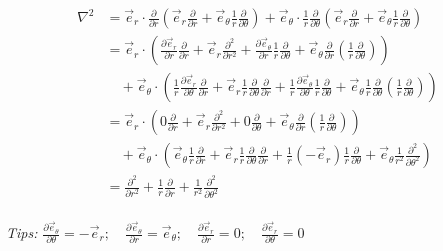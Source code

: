 \begin{frame}
	\[ \begin{aligned}
	\nabla ^2 &= \vec{e}_r \cdot\frac{\partial }{\partial r}  (\vec{e}_r \frac{\partial }{\partial r} +   \vec{e}_\theta \frac{1}{r} \frac{\partial }{\partial \theta})+  \vec{e}_\theta \cdot \frac{1}{r} \frac{\partial }{\partial \theta} (\vec{e}_r \frac{\partial }{\partial r} +   \vec{e}_\theta \frac{1}{r} \frac{\partial }{\partial \theta})\\
	&=\vec{e}_r \cdot (\frac{\partial \vec{e}_r}{\partial r} \frac{\partial }{\partial r} + \vec{e}_r \frac{\partial ^2 }{\partial r ^2}+  \frac{\partial \vec{e}_\theta}{\partial r} \frac{1}{r}\frac{\partial }{\partial \theta}+  \vec{e}_\theta\frac{\partial }{\partial r} (\frac{1}{r}\frac{\partial }{\partial \theta})) \\
	&\hspace{1em} + \vec{e}_\theta \cdot (\frac{1}{r}\frac{\partial \vec{e}_r}{\partial \theta} \frac{\partial }{\partial r} + \vec{e}_r \frac{1}{r} \frac{\partial }{\partial \theta} \frac{\partial }{\partial r} + \frac{1}{r} \frac{\partial  \vec{e}_\theta}{\partial \theta} \frac{1}{r} \frac{\partial }{\partial \theta} + \vec{e}_\theta \frac{1}{r} \frac{\partial }{\partial \theta} (\frac{1}{r} \frac{\partial }{\partial \theta} )
	) \\
	&=\vec{e}_r \cdot (0 \frac{\partial }{\partial r} + \vec{e}_r \frac{\partial ^2 }{\partial r ^2}+  0\frac{\partial }{\partial \theta}+  \vec{e}_\theta\frac{\partial }{\partial r} (\frac{1}{r}\frac{\partial }{\partial \theta})) \\
	&\hspace{1em} + \vec{e}_\theta \cdot (\vec{e}_\theta \frac{1}{r}\frac{\partial }{\partial r} + \vec{e}_r \frac{1}{r} \frac{\partial }{\partial \theta} \frac{\partial }{\partial r} + \frac{1}{r} (-\vec{e}_r) \frac{1}{r} \frac{\partial }{\partial \theta} + \vec{e}_\theta \frac{1}{r^2} \frac{\partial ^2 }{\partial \theta ^2}
	) \\
	&=  \frac{\partial^2  }{\partial r^2 } +\frac{1}{r } \frac{\partial  }{\partial r } +\frac{1}{r^2 } \frac{\partial ^2  }{\partial \theta ^2} 
	\end{aligned}\] 
~\\ \vspace{1em}
\alert{\textit{Tips:\hspace{1em}}} $\frac{\partial  \vec{e}_\theta}{\partial \theta}=-\vec{e}_r ;\quad \frac{\partial  \vec{e}_\theta}{\partial r}=\vec{e}_\theta ;  \quad \frac{\partial  \vec{e}_r}{\partial r}=0 ; \quad\frac{\partial  \vec{e}_r}{\partial \theta}=0 $ 
\end{frame}

